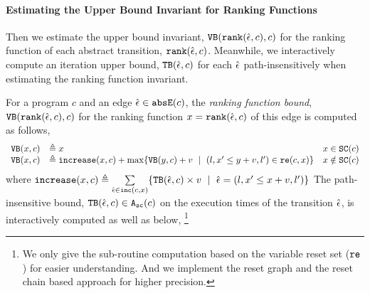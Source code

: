  \paragraph{Estimating the Upper Bound Invariant for Ranking Functions}
Then we estimate the upper bound invariant,  ${\mathtt{VB}}(\mathtt{rank}(\hat{\mathtt{\epsilon}{}}, c), c)$ for the ranking function of each abstract transition, $\mathtt{rank}(\hat{\mathtt{\epsilon}{}}, c)$. Meanwhile, we interactively compute an iteration upper bound,  ${\mathtt{TB}}(\hat{\mathtt{\epsilon}{}}, c)$  for each $\hat{\mathtt{\epsilon}{}}$ path-insensitively when estimating the ranking function invariant.
\begin{defn}
  \label{def:ranking_bound}
For a program $c$ and an edge $\hat{\mathtt{\epsilon}{}} \in \mathtt{abs}{\mathtt{E}}(c)$,
the \emph{ranking function bound}, 
${\mathtt{VB}}(\mathtt{rank}(\hat{\mathtt{\epsilon}{}}, c), c)$ for the ranking function $x = \mathtt{rank}(\hat{\mathtt{\epsilon}{}}, c)$
of this edge
is computed as follows,
{\small
  \[ 
\begin{array}{lll}
  \varinvar(x, c) & \triangleq x & x \in \scvar(c) \\
  \varinvar(x, c) & \triangleq \incrs(x, c) + \max\left\{\varinvar(y, c) + v ~\mid~ (l, x' \leq y + v, l') \in \reset(c, x) \right\} & x \notin \scvar(c)
\end{array}
\]
}
%
where $\mathtt{increase}(x, c) \triangleq \sum\limits_{\hat{\mathtt{\epsilon}{}} \in \mathtt{inc}(c, x)}\{{\mathtt{TB}}(\hat{\mathtt{\epsilon}{}}, c) \times v ~\mid~ \hat{\mathtt{\epsilon}{}} = (l, x' \leq x + v, l')\}$
The path-insensitive bound, ${\mathtt{TB}}(\hat{\mathtt{\epsilon}{}}, c) \in {\ensuremath{\mathtt{A_{sc}}}}(c)$  on the execution times of the transition $\hat{\mathtt{\epsilon}{}}$, is interactively computed as well as below,
\footnote{We only give the sub-routine computation based on the variable reset set ($\mathtt{re}$) for  easier understanding.
And we implement the reset graph and the reset chain based approach for higher precision.
}
{\small
}
\end{defn}
